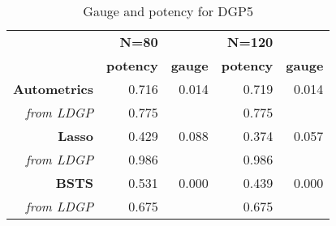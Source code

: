 \documentclass[11pt, oneside]{book}   	%
\begin{document}
\begin{table}[htbp]
  \centering

    \begin{tabular}{rrrrr}

          & \textbf{N=80} & \textbf{} & \textbf{N=120} & \textbf{} \\

          & \textbf{potency} & \textbf{gauge} & \textbf{potency} & \textbf{gauge} \\
    \textbf{Autometrics} & 0.716 & 0.014 & 0.719 & 0.014 \\
    \textit{from LDGP} & 0.775 &       & 0.775 &  \\
    \textbf{Lasso} & 0.429 & 0.088 & 0.374 & 0.057 \\
    \textit{from LDGP} & 0.986 &       & 0.986 &  \\
    \textbf{BSTS} & 0.531 & 0.000   & 0.439 & 0.000 \\
    \textit{from LDGP} & 0.675 &       & 0.675 &  \\

    \end{tabular}%
      \caption{Gauge and potency for DGP5}
  \label{DGP5GP}%
\end{table}%
\end{document}
